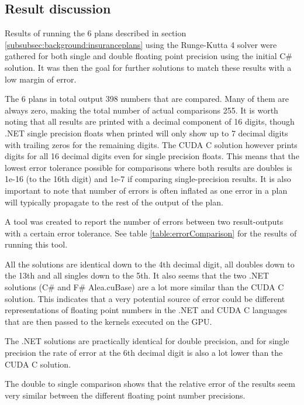 \subsection{Result discussion}\label{subsec:result_comparison}
Results of running the 6 plans described in section \ref{subsubsec:background:insuranceplans} using the Runge-Kutta 4 solver were gathered for both single and double floating point precision using the initial C\# solution.
It was then the goal for further solutions to match these results with a low margin of error.

The 6 plans in total output 398 numbers that are compared. 
Many of them are always zero, making the total number of actual comparisons 255.
It is worth noting that all results are printed with a decimal component of 16 digits, though .NET single precision floats when printed will only show up to 7 decimal digits with trailing zeros for the remaining digits.
The CUDA C solution however prints digits for all 16 decimal digits even for single precision floats.
This means that the lowest error tolerance possible for comparisons where both results are doubles is 1e-16 (to the 16th digit) and 1e-7 if comparing single-precision results.
It is also important to note that number of errors is often inflated as one error in a plan will typically propagate to the rest of the output of the plan.

A tool was created to report the number of errors between two result-outputs with a certain error tolerance.
See table \ref{table:errorComparison} for the results of running this tool.

All the solutions are identical down to the 4th decimal digit, all doubles down to the 13th and all singles down to the 5th.
It also seems that the two .NET solutions (C\# and F\# Alea.cuBase) are a lot more similar than the CUDA C solution.
This indicates that a very potential source of error could be different representations of floating point numbers in the .NET and CUDA C languages that are then passed to the kernels executed on the GPU.

The .NET solutions are practically identical for double precision, and for single precision the rate of error at the 6th decimal digit is also a lot lower than the CUDA C solution.

The double to single comparison shows that the relative error of the results seem very similar between the different floating point number precisions.


